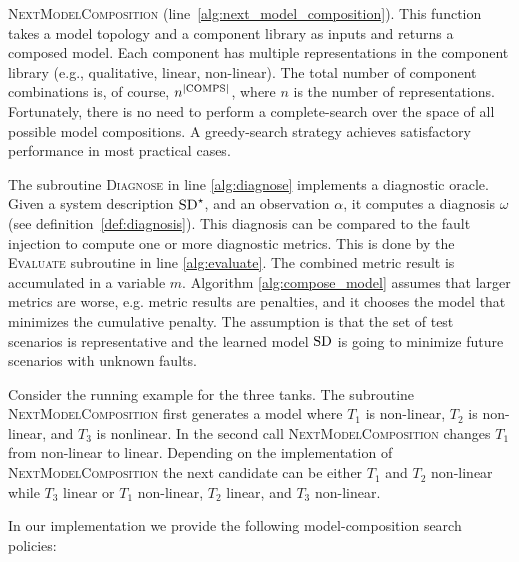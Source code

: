 \textsc{NextModelComposition}
(line~\ref{alg:next_model_composition}). This function takes a model
topology and a component library as inputs and returns a composed
model. Each component has multiple representations in the component
library (e.g., qualitative, linear, non-linear). The total number of
component combinations is, of course, $n^{|\mathrm{COMPS}|}$, where $n$ is the
number of representations. Fortunately, there is no need to perform a
complete-search over the space of all possible model compositions. A
greedy-search strategy achieves satisfactory performance in most
practical cases.
\par
The subroutine \textsc{Diagnose} in line \ref{alg:diagnose} implements
a diagnostic oracle. Given a system description $\mathrm{SD}^\star$, and an
observation $\alpha$, it computes a diagnosis $\omega$ (see
definition~\ref{def:diagnosis}). This diagnosis can be compared to the
fault injection to compute one or more diagnostic metrics. This is
done by the \textsc{Evaluate} subroutine in line
\ref{alg:evaluate}. The combined metric result is accumulated in a variable
$m$. Algorithm \ref{alg:compose_model} assumes that larger metrics are
worse, e.g. metric results are penalties, and it chooses the model
that minimizes the cumulative penalty. The assumption is that the set
of test scenarios is representative and the learned model $\mathrm{SD}$ is
going to minimize future scenarios with unknown faults.
\par
Consider the running example for the three tanks. The subroutine
\textsc{NextModelComposition} first generates a model where $T_1$ is
non-linear, $T_2$ is non-linear, and $T_3$ is nonlinear. In the second
call \textsc{NextModelComposition} changes $T_1$ from non-linear to
linear. Depending on the implementation of
\textsc{NextModelComposition} the next candidate can be either $T_1$
and $T_2$ non-linear while $T_3$ linear or $T_1$ non-linear, $T_2$
linear, and $T_3$ non-linear.
\par
In our implementation we provide the following model-composition
search policies:
%
